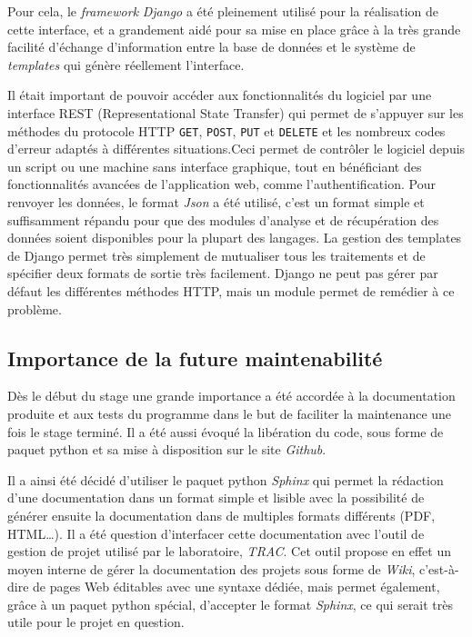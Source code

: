 \documentclass[12pt,a4paper,twoside]{report}
\begin{document}
Pour cela, le \emph{framework} \emph{Django} a été pleinement utilisé pour la
réalisation de cette interface, et a grandement aidé pour sa mise en place
grâce à la très grande facilité d’échange d’information entre la base de
données et le système de \emph{templates} qui génère réellement l’interface.

Il était important de pouvoir accéder aux fonctionnalités du logiciel par une
interface REST (Representational State Transfer) qui permet de s’appuyer sur
les méthodes du protocole HTTP \verb+GET+, \verb+POST+, \verb+PUT+ et
\verb+DELETE+ et les nombreux codes d’erreur adaptés à différentes situations.Ceci permet
de contrôler le logiciel depuis un script ou une machine
sans interface graphique, tout en bénéficiant des fonctionnalités avancées
de l'application web, comme l'authentification. Pour renvoyer les données, le format \emph{Json} a
été utilisé, c’est un format simple et suffisamment répandu pour que des
modules d’analyse et de récupération des données soient disponibles pour la
plupart des langages. La gestion des templates de Django permet très simplement
de mutualiser tous les traitements et de spécifier deux formats de sortie très
facilement. Django ne peut pas gérer par défaut les différentes méthodes HTTP,
mais un module permet de remédier à ce problème.

\subsection{Importance de la future maintenabilité}

Dès le début du stage une grande importance a été accordée à la documentation
produite et aux tests du programme dans le but de faciliter la maintenance une
fois le stage terminé. Il a été aussi évoqué la libération du code, sous forme
de paquet python et sa mise à disposition sur le site \emph{Github}.

Il a ainsi été décidé d’utiliser le paquet python \emph{Sphinx} qui permet la
rédaction d’une documentation dans un format simple et lisible avec la
possibilité de générer ensuite la documentation dans de multiples formats
différents (PDF, HTML\dots). Il a été question d’interfacer cette documentation
avec l’outil de gestion de projet utilisé par le laboratoire, \emph{TRAC}. Cet
outil propose en effet un moyen interne de gérer la documentation des projets
sous forme de \emph{Wiki}, c'est-à-dire de pages Web éditables avec une syntaxe
dédiée, mais permet également, grâce à un paquet python spécial, d’accepter le
format \emph{Sphinx}, ce qui serait très utile pour le projet en question.
\end{document}
